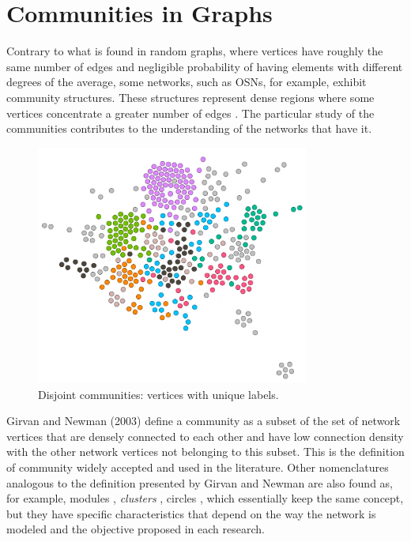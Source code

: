 

\section{Communities in Graphs}
\label{sec:communities}

Contrary to what is found in random graphs, where vertices have roughly the same number of edges and negligible probability of having elements with different degrees of the average, some networks, such as OSNs, for example, exhibit community structures. These structures represent dense regions where some vertices concentrate a greater number of edges \cite{FORTUNATO201075, Zhou2015b}. The particular study of the communities contributes to the understanding of the networks that have it.

\begin{figure}[htb]
	\centering
	\includegraphics[width=0.80\textwidth]{fig/intro/disjoint_communities.png}
	\caption{Disjoint communities: vertices with unique labels.}
	\label{fig:disjoint_communities}
\end{figure}

Girvan and Newman (2003)\cite{Girvan2003} define a community as a subset of the set of network vertices that are densely connected to each other and have low connection density with the other network vertices not belonging to this subset. This is the definition of community widely accepted and used in the literature. Other nomenclatures analogous to the definition presented by Girvan and Newman are also found as, for example, modules \cite{Lancichinetti2009b}, \textit{clusters} \cite {Lancichinetti2011}, circles \cite{Leskovec2012}, which essentially keep the same concept, but they have specific characteristics that depend on the way the network is modeled and the objective proposed in each research.


